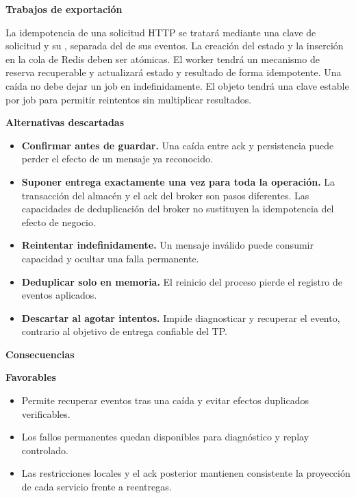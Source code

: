 \par\medskip\noindent\textbf{Trabajos de exportación}\par\nobreak\smallskip

La idempotencia de una solicitud HTTP se tratará mediante una clave de solicitud y su , separada del  de sus eventos. La creación del estado y la inserción en la cola de Redis deben ser atómicas. El worker tendrá un mecanismo de reserva recuperable y actualizará estado y resultado de forma idempotente. Una caída no debe dejar un job en  indefinidamente. El objeto tendrá una clave estable por job para permitir reintentos sin multiplicar resultados.

\par\medskip\noindent\textbf{Alternativas descartadas}\par\nobreak\smallskip

\begin{itemize}[leftmargin=1.5em,itemsep=3pt]
\item \textbf{Confirmar antes de guardar.} Una caída entre ack y persistencia puede perder el efecto de un mensaje ya reconocido.
\item \textbf{Suponer entrega exactamente una vez para toda la operación.} La transacción del almacén y el ack del broker son pasos diferentes. Las capacidades de deduplicación del broker no sustituyen la idempotencia del efecto de negocio.
\item \textbf{Reintentar indefinidamente.} Un mensaje inválido puede consumir capacidad y ocultar una falla permanente.
\item \textbf{Deduplicar solo en memoria.} El reinicio del proceso pierde el registro de eventos aplicados.
\item \textbf{Descartar al agotar intentos.} Impide diagnosticar y recuperar el evento, contrario al objetivo de entrega confiable del TP.
\end{itemize}

\par\medskip\noindent\textbf{Consecuencias}\par\nobreak\smallskip

\par\medskip\noindent\textbf{Favorables}\par\nobreak\smallskip

\begin{itemize}[leftmargin=1.5em,itemsep=3pt]
\item Permite recuperar eventos tras una caída y evitar efectos duplicados verificables.
\item Los fallos permanentes quedan disponibles para diagnóstico y replay controlado.
\item Las restricciones locales y el ack posterior mantienen consistente la proyección de cada servicio frente a reentregas.
\end{itemize}

